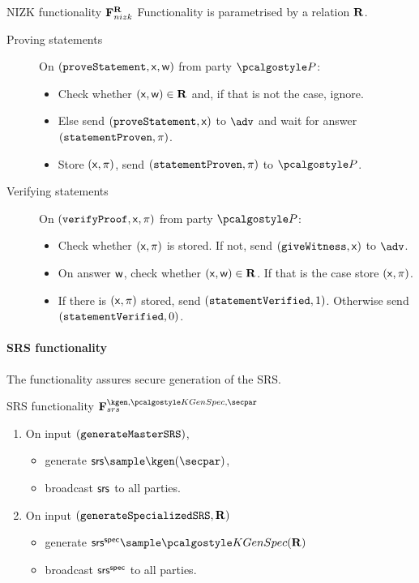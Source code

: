 \documentclass[runningheads,10pt]{llncs}
\numberwithin{equation}{section}
\begin{document}
\begin{funcbox}{NIZK functionality $\mathbf{F}_{{nizk}}^{\mathbf{R}}$} Functionality is
  parametrised by a relation $\mathbf{R}$.
  \begin{description}
  \item[Proving statements] On $(\mathtt{proveStatement}, \mathsf{x}, \mathsf{w})$ from party
    $\party$:
    \begin{itemize}
    \item Check whether $(\mathsf{x}, \mathsf{w}) \in \mathbf{R}$ and, if that is not the case,
      ignore.
    \item Else send $(\mathtt{proveStatement}, \mathsf{x})$ to $\adv$ and wait for answer
      $(\mathtt{statementProven}, \mathsf{\pi})$.
    \item Store $(\mathsf{x}, \mathsf{\pi})$, send $(\mathtt{statementProven}, \mathsf{\pi})$ to
      $\party$.
    \end{itemize}
  \item[Verifying statements] On $(\mathtt{verifyProof}, \mathsf{x}, \mathsf{\pi})$ from party
    $\party$:
    \begin{itemize}
    \item Check whether $(\mathsf{x}, \mathsf{\pi})$ is stored. If not, send
      $(\mathtt{giveWitness}, \mathsf{x})$ to $\adv$.
    \item On answer $\mathsf{w}$, check whether $(\mathsf{x}, \mathsf{w}) \in \mathbf{R}$.  If that is
      the case store $(\mathsf{x}, \mathsf{\pi})$.
    \item If there is $(\mathsf{x}, \mathsf{\pi})$ stored, send $(\mathtt{statementVerified},
      1)$.  Otherwise send $(\mathtt{statementVerified}, 0)$.
    \end{itemize}
  \end{description}
\end{funcbox}

\paragraph{SRS functionality}
The functionality assures secure generation of the SRS.
\begin{funcbox}{SRS functionality $\func{srs}^{\kgen, \kgens, \secpar}$}
  \begin{enumerate}
  \item On input $(\mathtt{generateMasterSRS})$,
    \begin{itemize}
    \item generate $\srs \sample \kgen(\secpar)$,
    \item broadcast $\mathsf{srs}$ to all parties.
    \end{itemize}
  \item On input $(\mathtt{generateSpecializedSRS}, \mathbf{R})$
    \begin{itemize}
    \item generate $\srss \sample \kgens(\REL)$
    \item broadcast $\mathsf{srs}^{\mathsf{spec}}$ to all parties.
    \end{itemize}
  \end{enumerate}
\end{funcbox}
\end{document}
